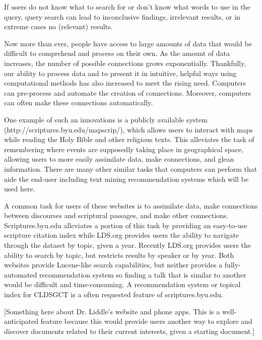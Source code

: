 If users do not know what to search for or don't know what words to use in the query, query search can lead to inconclusive findings, irrelevant results, or in extreme cases no (relevant) results.



Now more than ever, people have access to large amounts of data that would be difficult to comprehend and process on their own.  As the amount of data increases, the number of possible connections grows exponentially. Thankfully, our ability to process data and to present it in intuitive, helpful ways using computational methods has also increased to meet the rising need. Computers can pre-process and automate the creation of connections. Moreover, computers can often make these connections automatically. %

One example of such an innovations is a publicly available system (http://scriptures.byu.edu/mapscrip/), which allows users to interact with maps while reading the Holy Bible and other religious texts. This alleviates the task of remembering where events are supposedly taking place in geographical space, allowing users to more easily assimilate data, make connections, and glean information. There are many other similar tasks that computers can perform that aide the end-user including text mining recommendation systems which will be used here.  %

A common task for users of these websites is to assimilate data, make connections between discourses and scriptural passages, and make other connections. Scriptures.byu.edu alleviates a portion of this task by providing an easy-to-use scripture citation index while LDS.org provides users the ability to navigate through the dataset by topic, given a year. Recently LDS.org provides users the ability to search by topic, but restricts results by speaker or by year. Both websites provide Lucene-like search capabilities, but neither provides a fully-automated recommendation system so finding a talk that is similar to another would be difficult and time-consuming. A recommendation system or topical index for CLDSGCT is a often requested feature of scriptures.byu.edu. 

[Something here about Dr. Liddle's website and phone apps. This is a well-anticipated feature because this would provide users another way to explore and discover documents related to their current interests, given a starting document.]


